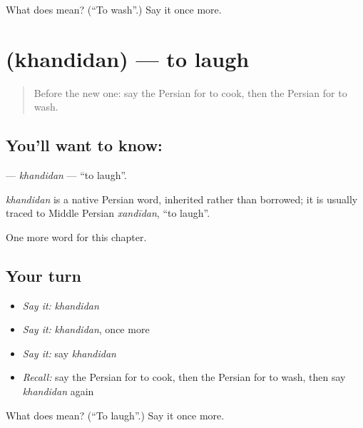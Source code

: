 \begin{tcolorbox}[breakable,colback=teal!4,colframe=teal!35!black,title={Before you move on}]
What does  mean? (\textquotedblleft{}To wash\textquotedblright{}.) Say it once more.
\end{tcolorbox}
\section[\texorpdfstring{\fa{خندیدن} (khandidan)}{خندیدن (khandidan)}]{ (khandidan) — to laugh}

\label{lesson:FA-C37-khandidan}



\begin{quote}
Before the new one: say the Persian for to cook, then the Persian for to wash.
\end{quote}

\subsection*{You'll want to know: }
\textbf{} — \emph{khandidan} — \textquotedblleft{}to laugh\textquotedblright{}.

\begin{cousinweb}
\emph{khandidan} is a native Persian word, inherited rather than borrowed; it is usually traced to Middle Persian \emph{xandīdan}, \textquotedblleft{}to laugh\textquotedblright{}.
\end{cousinweb}

\begin{grammarlens}[title={What you've built}]
One more word for this chapter.
\end{grammarlens}

\subsection*{Your turn}
\begin{itemize}
\raggedright
  \item \emph{Say it:} \emph{khandidan}
  \item \emph{Say it:} \emph{khandidan}, once more
  \item \emph{Say it:} say \emph{khandidan}
  \item \emph{Recall:} say the Persian for to cook, then the Persian for to wash, then say \emph{khandidan} again
\end{itemize}

\begin{tcolorbox}[breakable,colback=teal!4,colframe=teal!35!black,title={Before you move on}]
What does  mean? (\textquotedblleft{}To laugh\textquotedblright{}.) Say it once more.
\end{tcolorbox}
